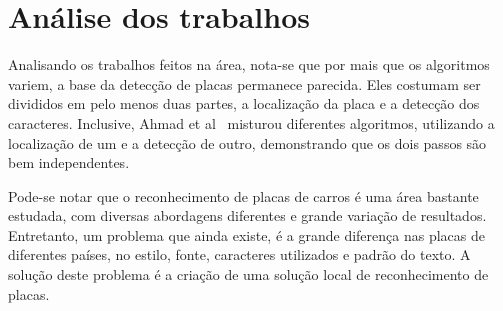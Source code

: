 \section{Análise dos trabalhos}

Analisando os trabalhos feitos na área, nota-se que por mais que os algoritmos variem,
a base da detecção de placas permanece parecida. Eles costumam ser divididos em pelo
menos duas partes, a localização da placa e a detecção dos caracteres. Inclusive, Ahmad et al~\cite{ahmad2015automatic}
misturou diferentes algoritmos, utilizando a localização de um e a detecção de
outro, demonstrando que os dois passos são bem independentes.

Pode-se notar que o reconhecimento de placas de carros é uma área bastante estudada,
com diversas abordagens diferentes e grande variação de resultados. Entretanto,
um problema que ainda existe, é a grande diferença nas placas de diferentes países,
no estilo, fonte, caracteres utilizados e padrão do texto. A solução deste problema
é a criação de uma solução local de reconhecimento de placas.
